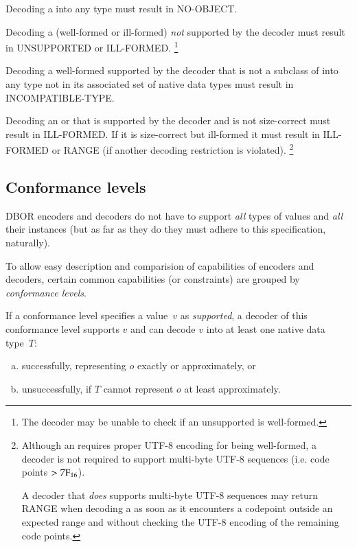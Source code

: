 Decoding a \DborNoneValue{} into any type must result in NO-OBJECT.

\medskip
Decoding a (well-formed or ill-formed) \DborValue{} \emph{not} supported by the decoder
must result in UNSUPPORTED or ILL-FORMED.%
\footnote{%
    The decoder may be unable to check if an unsupported \DborValue{} is well-formed.
}

\medskip
Decoding a well-formed \DborValue{} supported by the decoder that is not a subclass of \DborNumberValue{}
into any type not in its associated set of native data types must result in INCOMPATIBLE-TYPE.

\medskip
Decoding an \DborContainerValue{} or \DborUtfEightStringValue{} that is supported by the decoder and
is not size-correct must result in ILL-FORMED.
If it is size-correct but ill-formed it must result in ILL-FORMED or RANGE
(if another decoding restriction is violated).%
\footnote{%
    Although an \DborUtfEightStringValue{} requires proper UTF-8 encoding for being well-formed,
    a decoder is not required to support multi-byte UTF-8 sequences (i.e. code points $> \mathrm{7F}_{16}$).

    A decoder that \emph{does} supports multi-byte UTF-8 sequences
    may return RANGE when decoding a \DborUtfEightStringValue{} as soon as it encounters a codepoint outside
    an expected range and without checking the UTF-8 encoding of the remaining code points.
}

\subsection{Conformance levels}
\label{sec:conformancelevels}

DBOR encoders and decoders do not have to support \emph{all} types of values and \emph{all} their instances
(but as far as they do they must adhere to this specification, naturally).

To allow easy description and comparision of capabilities of encoders and decoders,
certain common capabilities (or constraints) are grouped by \emph{conformance levels}.

\medskip
If a conformance level specifies a value~$v$ as \emph{supported},
a decoder of this conformance level supports $v$ and can decode $v$ into at least one native data type~$T$:
\begin{enumerate}[a)]
    \item successfully, representing $o$ exactly or approximately, or
    \item unsuccessfully, if $T$ cannot represent $o$ at least approximately.
\end{enumerate}

